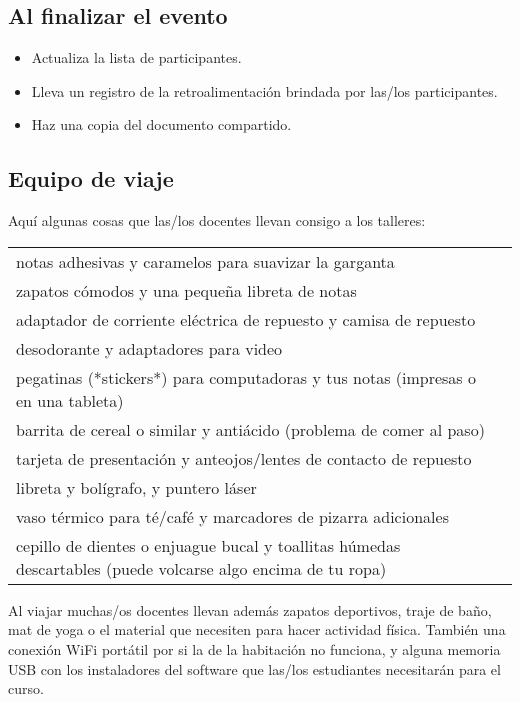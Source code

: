 \subsection*{Al finalizar el evento}

\begin{itemize}

\item
  Actualiza la lista de participantes.

\item
  Lleva un registro de la retroalimentación brindada por las/los participantes.

\item
  Haz una copia del documento compartido.

\end{itemize}

\subsection*{Equipo de viaje}

Aquí algunas cosas que las/los docentes llevan consigo a los talleres:

\begin{longtable}{p{}p{}}

notas adhesivas y caramelos para suavizar la garganta \\
zapatos cómodos y una pequeña libreta de notas \\
adaptador de corriente eléctrica de repuesto y camisa de repuesto \\
desodorante y adaptadores para video \\
pegatinas (*stickers*) para computadoras y tus notas (impresas o en una tableta) \\
barrita de cereal o similar y antiácido (problema de comer al paso) \\
tarjeta de presentación y anteojos/lentes de contacto de repuesto \\
libreta y bolígrafo, y puntero láser \\
vaso térmico para té/café y marcadores de pizarra adicionales \\
cepillo de dientes o enjuague bucal y toallitas húmedas descartables (puede volcarse algo encima de tu ropa) \\

\end{longtable}

Al viajar
muchas/os docentes llevan además zapatos deportivos, traje de baño, mat de yoga
o el material que necesiten para hacer actividad física.
También una conexión WiFi portátil por si la de la habitación no funciona,
y alguna memoria USB con los instaladores del software que las/los estudiantes 
necesitarán para el curso.

